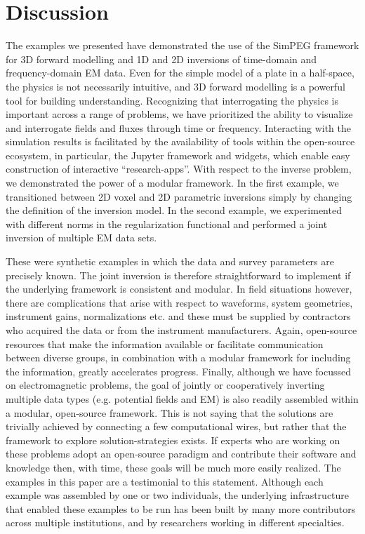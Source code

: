 \documentclass[paper]{geophysics}
\begin{document}



\section{Discussion}

The examples we presented have demonstrated the use of the SimPEG framework for 3D forward modelling and 1D and 2D inversions of time-domain and frequency-domain EM data. Even for the simple model of a plate in a half-space, the physics is not necessarily intuitive, and 3D forward modelling is a powerful tool for building understanding. Recognizing that interrogating the physics is important across a range of problems, we have prioritized the ability to visualize and interrogate fields and fluxes through time or frequency. Interacting with the simulation results is facilitated by the availability of tools within the open-source ecosystem, in particular, the Jupyter framework and widgets, which enable easy construction of interactive ``research-apps''. With respect to the inverse problem, we demonstrated the power of a modular framework. In the first example, we transitioned between 2D voxel and 2D parametric inversions simply by changing the definition of the inversion model. In the second example, we experimented with different norms in the regularization functional and performed a joint inversion of multiple EM data sets.

These were synthetic examples in which the data and survey parameters are precisely known. The joint inversion is therefore straightforward to implement if the underlying framework is consistent and modular. In field situations however, there are complications that arise with respect to waveforms, system geometries, instrument gains, normalizations etc. and these must be supplied by contractors who acquired the data or from the instrument manufacturers. Again, open-source resources that make the information available or facilitate communication between diverse groups, in combination with a modular framework for including the information, greatly accelerates progress. Finally, although we have focussed on electromagnetic problems, the goal of jointly or cooperatively inverting multiple data types (e.g. potential fields and EM) is also readily assembled within a modular, open-source framework. This is not saying that the solutions are trivially achieved by connecting a few computational wires, but rather that the framework to explore solution-strategies exists. If experts who are working on these problems adopt an open-source paradigm and contribute their software and knowledge then, with time, these goals will be much more easily realized. The examples in this paper are a testimonial to this statement. Although each example was assembled by one or two individuals, the underlying infrastructure that enabled these examples to be run has been built by many more contributors across multiple institutions, and by researchers working in different specialties.
\end{document}
